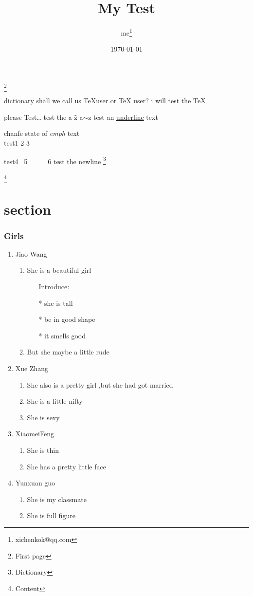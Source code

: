 \documentclass[11pt,a4paper,twoside]{article}
\begin{document}
\title{My Test}
\author{me\thanks{xichenkok@qq.com}}
\date{\today}
\maketitle
\footnote{First page}
\newpage
{}
\begin{center}
  dictionary
\newpage
shall we call us \TeX user or \TeX{} user?
i will test the \TeX

please Test\ldots
test the a \~ z a$\sim$z
test an \underline{underline} text


chanfe state of \emph{emph} text\\
test1 2  3


test4 ~5~~~~~~6
test the newline\newline
\footnote{Dictionary}

\end{center}

\appendix
\footnote{Content}
\part[head,bottom]{section}

\section{Girls}
\begin{enumerate}
  \item Jiao Wang
  \begin{enumerate}
    \item She is a beautiful girl
    \begin{enumerate}
    \item[Introduce:]
      \item[*] she is tall
      \item[*] be in good shape
      \item[*] it smells good
    \end{enumerate}
    \item But she maybe a little rude
  \end{enumerate}
  \item Xue Zhang
  \begin{enumerate}
    \item She also is a pretty girl ,but she had got married
    \item She is a little nifty
    \item She is sexy
  \end{enumerate}
  \item XiaomeiFeng
  \begin{enumerate}
    \item She is thin
    \item She has a pretty little face
  \end{enumerate}
  \item Yunxuan guo
  \begin{enumerate}
    \item She is my classmate
    \item She is full figure
  \end{enumerate}
\end{enumerate}
\end{document}

